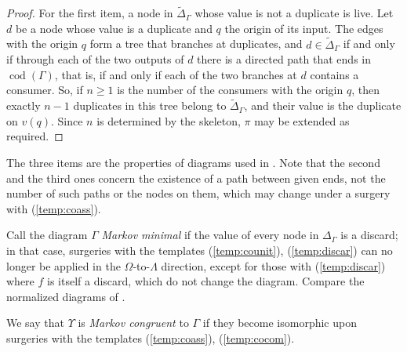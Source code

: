 \documentclass[12pt]{amsart}
\theoremstyle{plain}
\theoremstyle{definition}
\theoremstyle{remark}
\numberwithin{equation}{section}
\theoremstyle{plain}
\DeclareMathOperator{\cod}{cod}
\newcommand{\0}{\emptyset}
\newcommand{\memph}[1]{{\color{magenta}\emph{#1}}}
\begin{document}
\begin{proof}
For the first item, a node in $\tilde \Delta_\Gamma$ whose value is not a duplicate is live. Let $d$ be a node whose value is a duplicate and $q$ the origin of its input. The edges with the origin $q$ form a tree that branches at duplicates, and $d \in \tilde \Delta_\Gamma$ if and only if through each of the two outputs of $d$ there is a directed path that ends in $\cod(\Gamma)$, that is, if and only if each of the two branches at $d$ contains a consumer. So, if $n \geq 1$ is the number of the consumers with the origin $q$, then exactly $n - 1$ duplicates in this tree belong to $\tilde \Delta_\Gamma$, and their value is the duplicate on $v(q)$. Since $n$ is determined by the skeleton, $\pi$ may be extended as required.
\end{proof}

The three items are the properties of diagrams used in \cite{yinzhang2021}. Note that the second and the third ones concern the existence of a path between given ends, not the number of such paths or the nodes on them, which may change under a surgery with (\ref{temp:coass}).

Call the diagram $\Gamma$ \memph{Markov minimal} if the value of every node in $\Delta_\Gamma$ is a discard; in that case, surgeries with the templates  (\ref{temp:counit}), (\ref{temp:discar}) can no longer be applied in the $\Omega$-to-$\Lambda$ direction, except for those with (\ref{temp:discar}) where $f$ is itself a discard, which do not change the diagram. Compare the normalized diagrams of \cite[Definition~6.2]{FriLiang2022}.

We say that $\Upsilon$ is \memph{Markov congruent} to $\Gamma$ if they become isomorphic upon surgeries with the templates (\ref{temp:coass}), (\ref{temp:cocom}).
\end{document}
